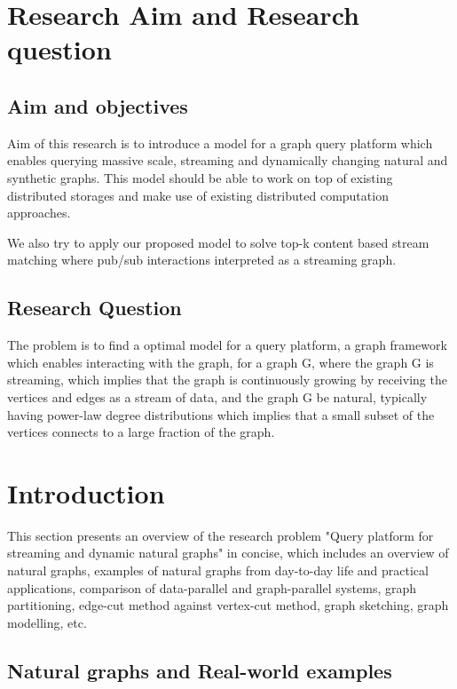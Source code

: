 \documentclass[12pt]{article}
\begin{document}
\section{Research Aim and Research question}

\subsection{Aim and objectives}

Aim of this research is to introduce a model for a graph query platform which enables querying massive scale, streaming and dynamically changing natural and synthetic graphs. This model should be able to work on top of existing distributed storages and make use of existing distributed computation approaches.

We also try to apply our proposed model to solve top-k content based stream matching where pub/sub interactions interpreted as a streaming graph.
 
\subsection{Research Question}
The problem is to find a optimal model for a query platform, a graph framework which enables interacting with the graph, for a graph G, where the graph G is streaming, which implies that the graph is continuously growing by receiving the vertices and edges as a stream of data, and the graph G be natural, typically having power-law degree distributions which implies that a small subset of the vertices connects to a large fraction of the graph.

\clearpage 
\section{Introduction}

This section presents an overview of the research problem "Query platform for streaming and dynamic natural graphs" in concise, which includes an overview of natural graphs, examples of natural graphs from day-to-day life and practical applications, comparison of data-parallel and graph-parallel systems, graph partitioning, edge-cut method against vertex-cut method, graph sketching, graph modelling, etc.

\subsection{Natural graphs and Real-world examples}
\end{document}
